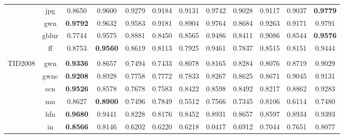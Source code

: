 \documentclass[11pt,a4paper]{article}
\begin{document}
\begin{table}[!htb]
\begin{scriptsize}
{\begin{threeparttable}
\begin{tabular}{*{12}{c}}
& jpg & \cellcolor{green!25}0.8650 & \cellcolor{green!25}0.9600 & \cellcolor{green!25}0.9279 & \cellcolor{green!25}0.9184 & \cellcolor{green!25}0.9131 & 0.9742 & \cellcolor{green!25}0.9028 & \cellcolor{green!25}0.9117 & \cellcolor{green!25}0.9037 & \textbf{0.9779}\\
& gwn & \textbf{0.9792} & \cellcolor{green!25}0.9632 & \cellcolor{green!25}0.9583 & \cellcolor{green!25}0.9181 & \cellcolor{green!25}0.8904 & 0.9764 & \cellcolor{green!25}0.8684 & \cellcolor{green!25}0.9263 & \cellcolor{green!25}0.9171 & 0.9791\\
& gblur & \cellcolor{green!25}0.7744 & 0.9575 & \cellcolor{green!25}0.8881 & \cellcolor{green!25}0.8450 & \cellcolor{green!25}0.8565 & 0.9486 & \cellcolor{green!25}0.8411 & \cellcolor{green!25}0.9086 & \cellcolor{green!25}0.8544 & \textbf{0.9576}\\
& ff & \cellcolor{green!25}0.8753 & \textbf{0.9560} & \cellcolor{green!25}0.8619 & \cellcolor{green!25}0.8113 & \cellcolor{green!25}0.7925 & 0.9461 & \cellcolor{green!25}0.7837 & \cellcolor{green!25}0.8515 & \cellcolor{green!25}0.8151 & 0.9444\\
\\
\multirow{17}{*}{TID2008} & gwn & \textbf{0.9336} & 0.8657 & \cellcolor{green!25}0.7494 & \cellcolor{green!25}0.7433 & \cellcolor{green!25}0.8078 & \cellcolor{green!25}0.8165 & \cellcolor{green!25}0.8284 & \cellcolor{green!25}0.8076 & 0.8719 & 0.9029\\
& gwnc & \textbf{0.9208} & 0.8928 & \cellcolor{green!25}0.7758 & \cellcolor{green!25}0.7772 & \cellcolor{green!25}0.7833 & \cellcolor{green!25}0.8267 & 0.8625 & 0.8671 & 0.9045 & 0.9131\\
& scn & \textbf{0.9526} & \cellcolor{green!25}0.8578 & \cellcolor{green!25}0.7678 & \cellcolor{green!25}0.7583 & \cellcolor{green!25}0.8422 & \cellcolor{green!25}0.8598 & \cellcolor{green!25}0.8492 & \cellcolor{green!25}0.8217 & 0.8862 & 0.9283\\
& mn & \cellcolor{red!25}0.8627 & \cellcolor{red!25}\textbf{0.8900} & 0.7496 & 0.7849 & \cellcolor{green!25}0.5512 & 0.7566 & 0.7345 & 0.8106 & 0.6114 & 0.7480\\
& hfn & \cellcolor{red!25}\textbf{0.9680} & 0.9441 & \cellcolor{green!25}0.8228 & \cellcolor{green!25}0.8176 & \cellcolor{green!25}0.8452 & \cellcolor{green!25}0.8931 & \cellcolor{green!25}0.8657 & \cellcolor{green!25}0.8597 & \cellcolor{green!25}0.8934 & 0.9393\\
& in & \textbf{0.8566} & 0.8146 & \cellcolor{green!25}0.6202 & \cellcolor{green!25}0.6220 & \cellcolor{green!25}0.6218 & \cellcolor{green!25}0.0417 & 0.6912 & 0.7044 & 0.7651 & 0.8077\\

\end{tabular}
\end{threeparttable}}
\end{scriptsize}
\end{table}
\end{document}
